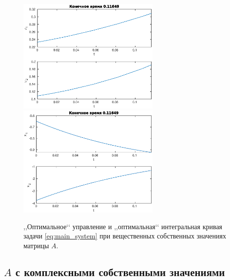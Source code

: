 \begin{figure}[h]
                \hfill
                \includegraphics[width=70mm]{program/real-control.eps}
                \hfill
                \hfill
                \includegraphics[width=70mm]{program/real-traectory.eps}
                \hfill
                \caption{,,Оптимальное‘‘ управление и ,,оптимальная‘‘ интегральная кривая задачи \eqref{eq:main_system} при вещественных собственных значениях матрицы $A$.}
\end{figure}

\subsection{$A$ с комплексными собственными значениями}

